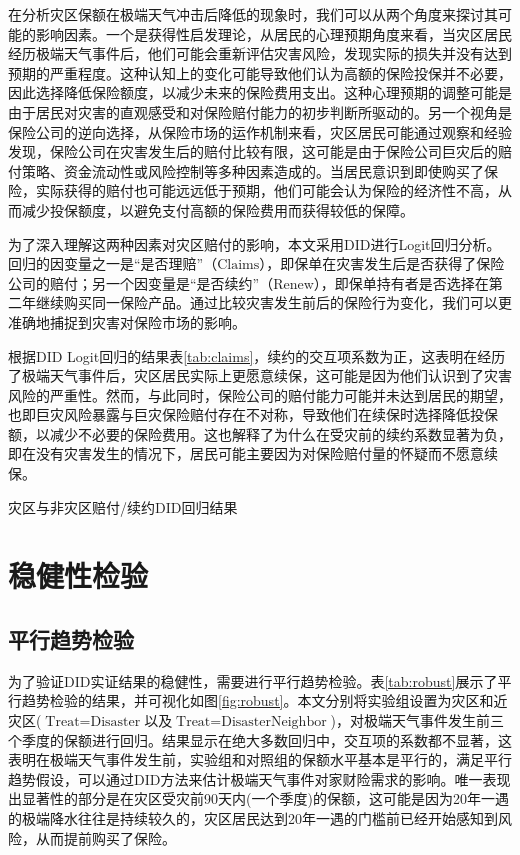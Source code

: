 在分析灾区保额在极端天气冲击后降低的现象时，我们可以从两个角度来探讨其可能的影响因素。一个是获得性启发理论\citep{0Do}，从居民的心理预期角度来看，当灾区居民经历极端天气事件后，他们可能会重新评估灾害风险，发现实际的损失并没有达到预期的严重程度。这种认知上的变化可能导致他们认为高额的保险投保并不必要，因此选择降低保险额度，以减少未来的保险费用支出。这种心理预期的调整可能是由于居民对灾害的直观感受和对保险赔付能力的初步判断所驱动的。另一个视角是保险公司的逆向选择，从保险市场的运作机制来看，灾区居民可能通过观察和经验发现，保险公司在灾害发生后的赔付比较有限，这可能是由于保险公司巨灾后的赔付策略、资金流动性或风险控制等多种因素造成的\citep{田玲2009中国财产保险业巨灾损失赔付能力实证研究}。当居民意识到即使购买了保险，实际获得的赔付也可能远远低于预期，他们可能会认为保险的经济性不高，从而减少投保额度，以避免支付高额的保险费用而获得较低的保障。

为了深入理解这两种因素对灾区赔付的影响，本文采用DID进行Logit回归分析。回归的因变量之一是“是否理赔”（$\text{Claims}$），即保单在灾害发生后是否获得了保险公司的赔付；另一个因变量是“是否续约”（$\text{Renew}$），即保单持有者是否选择在第二年继续购买同一保险产品。通过比较灾害发生前后的保险行为变化，我们可以更准确地捕捉到灾害对保险市场的影响。

根据DID Logit回归的结果表\ref{tab:claims}，续约的交互项系数为正，这表明在经历了极端天气事件后，灾区居民实际上更愿意续保，这可能是因为他们认识到了灾害风险的严重性。然而，与此同时，保险公司的赔付能力可能并未达到居民的期望，也即巨灾风险暴露与巨灾保险赔付存在不对称\citep{张旭升2010中国巨灾风险暴露与巨灾保险赔付不对称实证}，导致他们在续保时选择降低投保额，以减少不必要的保险费用。这也解释了为什么在受灾前的续约系数显著为负，即在没有灾害发生的情况下，居民可能主要因为对保险赔付量的怀疑而不愿意续保。

\begin{table}[htbp]
    \centering
    \caption{灾区与非灾区赔付/续约DID回归结果}\label{tab:claims}
    
\end{table}

\section{稳健性检验}
\subsection{平行趋势检验}

为了验证DID实证结果的稳健性，需要进行平行趋势检验。表\ref{tab:robust}展示了平行趋势检验的结果，并可视化如图\ref{fig:robust}。本文分别将实验组设置为灾区和近灾区($\text{Treat}=\text{Disaster}$以及$\text{Treat}=\text{Disaster}\text{Neighbor}$)，对极端天气事件发生前三个季度的保额进行回归。结果显示在绝大多数回归中，交互项的系数都不显著，这表明在极端天气事件发生前，实验组和对照组的保额水平基本是平行的，满足平行趋势假设，可以通过DID方法来估计极端天气事件对家财险需求的影响。唯一表现出显著性的部分是在灾区受灾前90天内(一个季度)的保额，这可能是因为20年一遇的极端降水往往是持续较久的，灾区居民达到20年一遇的门槛前已经开始感知到风险，从而提前购买了保险。

